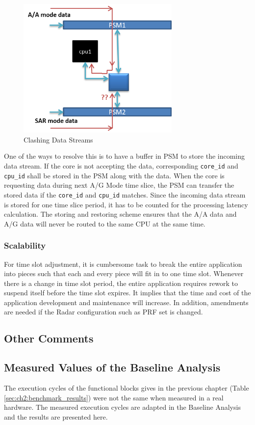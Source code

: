 \begin{figure}[h!]
	\centering
	\includegraphics[width=80mm]{figures/data_clash}
	\caption{Clashing Data Streams}
	\label{fig:mm:data_clash}
\end{figure}

One of the ways to resolve this is to have a buffer in PSM to store the incoming data stream. If the core is not accepting the data, corresponding \verb|core_id| and \verb|cpu_id| shall be stored in the PSM along with the data. When the core is requesting data during next A/G Mode time slice, the PSM can transfer the stored data if the \verb|core_id| and \verb|cpu_id| matches. Since the incoming data stream is stored for one time slice period, it has to be counted for the processing latency calculation. The storing and restoring scheme ensures that the A/A data and A/G data will never be routed to the same CPU at the same time.

\subsubsection{Scalability}
\label{sss:mm:cons:scalability}
For time slot adjustment, it is cumbersome task to break the entire application into pieces such that each and every piece will fit in to one time slot. Whenever there is a change in time slot period, the entire application requires rework to suspend itself before the time slot expires. It implies that the time and cost of the application development and maintenance will increase. In addition, amendments are needed if the Radar configuration such as PRF set is changed.

\subsection{Other Comments}
\subsection{Measured Values of the Baseline Analysis}
\label{mm:cons:real_values}
The execution cycles of the functional blocks gives in the previous chapter (Table \ref{sec:ch2:benchmark_results}) were not the same when measured in a real hardware. The measured execution cycles are adapted in the Baseline Analysis and the results are presented here.

